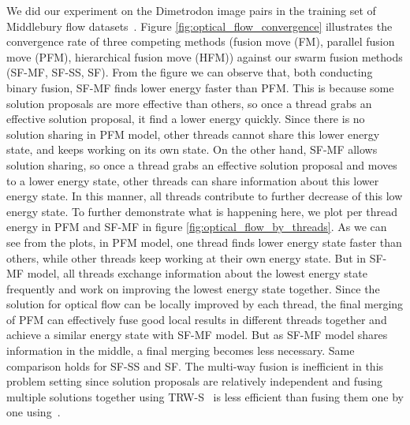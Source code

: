 We did our experiment on the Dimetrodon image pairs in the training set of Middlebury flow datasets~\cite{middlebury_flow}. Figure \ref{fig:optical_flow_convergence} illustrates the convergence rate of three competing methods (fusion move (FM), parallel fusion move (PFM), hierarchical fusion move (HFM)) against
our swarm fusion methods (SF-MF, SF-SS, SF). From the figure we can observe that, both conducting binary fusion, SF-MF finds lower energy faster than PFM. This is because some solution proposals are more effective than others, so once a thread grabs an effective solution proposal, it find a lower energy quickly. Since there is no solution sharing in PFM model, other threads cannot share this lower energy state, and keeps working on its own state. On the other hand, SF-MF allows solution sharing, so once a thread grabs an effective solution proposal and moves to a lower energy state, other threads can share information about this lower energy state. In this manner, all threads contribute to further decrease of this low energy state. To further demonstrate what is happening here, we plot per thread energy in PFM and SF-MF in figure \ref{fig:optical_flow_by_threads}. As we can see from the plots, in PFM model, one thread finds lower energy state faster than others, while other threads keep working at their own energy state. But in SF-MF model, all threads exchange information about the lowest energy state frequently and work on improving the lowest energy state together. Since the solution for optical flow can be locally improved by each thread, the final merging of PFM can effectively fuse good local results in different threads together and achieve a similar energy state with SF-MF model. But as SF-MF model shares information in the middle, a final merging becomes less necessary. Same comparison holds for SF-SS and SF. The multi-way fusion is inefficient in this problem setting since solution proposals are relatively independent and fusing multiple solutions together using TRW-S~\cite{TRW-S} is less efficient than fusing them one by one using~\cite{QPBO}.

